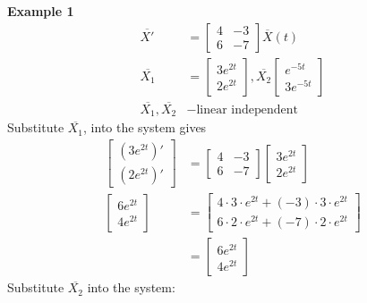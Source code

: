 \documentclass[10pt, letterpaper]{article}
\begin{document}
\textbf{Example 1}
\begin{align*}
\overline{X'} &= \begin{bmatrix}
	4 & -3\\
	6 & -7
\end{bmatrix}
\overline{X}(t)\\
\overline{X_1} &= \begin{bmatrix}
	3e^{2t}\\
	2e^{2t}
\end{bmatrix}, \overline{X_2}\begin{bmatrix}
	e^{-5t}\\
	3e^{-5t}
\end{bmatrix}\\
\overline{X_1}, \overline{X_2} &- \text{linear independent}
\end{align*}
Substitute $\overline{X_1}$, into the system gives
\begin{align*}
\begin{bmatrix}
	(3e^{2t})'\\
	(2e^{2t})'
\end{bmatrix} &= \begin{bmatrix}
	4 & -3\\
	6 & -7
\end{bmatrix} \begin{bmatrix}
	3e^{2t}\\
	2e^{2t}
\end{bmatrix}\\
\begin{bmatrix}
	6e^{2t}\\
	4e^{2t}
\end{bmatrix} &= \begin{bmatrix}
	4\cdot 3\cdot e^{2t}+(-3)\cdot 3\cdot e^{2t}\\
	6\cdot 2\cdot e^{2t}+(-7)\cdot 2\cdot e^{2t}
\end{bmatrix}\\
&= \begin{bmatrix}
	6e^{2t}\\
	4e^{2t}
\end{bmatrix}
\end{align*}
Substitute $\overline{X_2}$ into the system:
\end{document}
